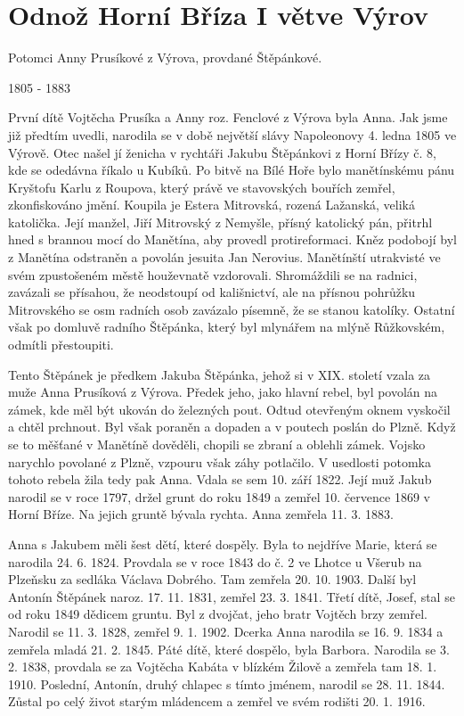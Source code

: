 \documentclass[../dejiny-rodu-prusiku.tex]{subfiles}
\begin{document}
\section{Odnož Horní Bříza I větve Výrov}

Potomci Anny Prusíkové z Výrova, provdané Štěpánkové.

1805 - 1883

První dítě Vojtěcha Prusíka a Anny roz. Fenclové z Výrova byla Anna. Jak jsme již předtím uvedli, narodila se v době největší slávy Napoleonovy 4. ledna 1805 ve Výrově. Otec našel jí ženicha v rychtáři Jakubu Štěpánkovi z Horní Břízy č. 8, kde se odedávna říkalo u Kubíků. Po bitvě na Bílé Hoře bylo manětínskému pánu Kryštofu Karlu z Roupova, který právě ve stavov­ských bouřích zemřel, zkonfiskováno jmění. Koupila je Estera Mitrovská, rozená Lažanská, veliká katolička. Její manžel, Jiří Mitrovský z Nemyšle, přísný katolický pán, přitrhl hned s brannou mocí do Manětína, aby pro­vedl protireformaci. Kněz podobojí byl z Manětína od­straněn a povolán jesuita Jan Nerovius. Manětínští utrakvisté ve svém zpustošeném městě houževnatě vzdorovali. Shromáždili se na radnici, zavázali se přísahou, že neodstoupí od kališnictví, ale na přísnou pohrůžku Mitrovského se osm radních osob zavázalo písemně, že se stanou katolíky. Ostatní však po domluvě radního Štěpánka, který byl mlynářem na mlýně Růžkovském, odmítli přestoupiti.

Tento Štěpánek je předkem Jakuba Štěpánka, jehož si v XIX. století vzala za muže Anna Prusíková z Výrova. Pře­dek jeho, jako hlavní rebel, byl povolán na zámek, kde měl být ukován do železných pout. Odtud otevřeným oknem vyskočil a chtěl prchnout. Byl však poraněn a dopaden a v poutech poslán do Plzně. Když se to měšťané v Manětíně dověděli, chopili se zbraní a oblehli zámek. Vojsko narychlo povolané z Plzně, vzpouru však záhy potlačilo. V usedlosti potomka tohoto rebela žila tedy pak Anna. Vdala se sem 10. září 1822. Její muž Jakub narodil se v roce 1797, držel grunt do roku 1849 a zemřel 10. červen­ce 1869 v Horní Bříze. Na jejich gruntě bývala rychta. Anna zemřela 11. 3. 1883.

Anna s Jakubem měli šest dětí, které dospěly. Byla to nejdříve Marie, která se narodila 24. 6. 1824. Provdala se v roce 1843 do č. 2 ve Lhotce u Všerub na Plzeňsku za sedláka Václava Dobrého. Tam zemřela 20. 10. 1903.  Další byl Antonín Štěpánek naroz. 17. 11. 1831, zemřel 23. 3. 1841. Třetí dítě, Josef, stal se od roku 1849 dě­dicem gruntu. Byl z dvojčat, jeho bratr Vojtěch brzy zemřel. Narodil se 11. 3. 1828, zemřel 9. 1. 1902. Dcerka Anna narodila se 16. 9. 1834 a zemřela mladá 21. 2. 1845. Páté dítě, které dospělo, byla Barbora. Narodila se 3. 2. 1838, provdala se za Vojtěcha Kabáta v blízkém Ži­lově a zemřela tam 18. 1. 1910. Poslední, Antonín, druhý chlapec s tímto jménem, narodil se 28. 11. 1844. Zůstal po celý život starým mládencem a zemřel ve svém rodišti 20. 1. 1916.
\end{document}
